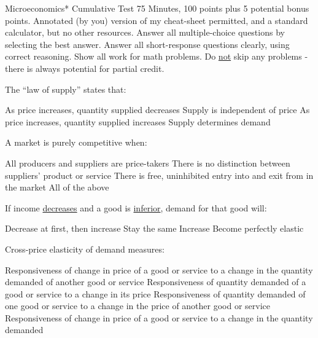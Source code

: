 \documentclass[12pt]{exam}
\begin{document}
\FontEasyRead

\Heading
{Microeconomics*}
{Cumulative Test}
{75 Minutes, 100 points plus 5 potential bonus points.
  Annotated (by you) version of my cheat-sheet permitted, and a standard calculator, but
  no other resources. Answer all multiple-choice questions by selecting the best answer.
  Answer all short-response questions clearly, using correct reasoning.
  Show all work for math problems. Do \underline{not} skip any problems - there
is always potential for partial credit.}


\begin{questions}

  \begin{mcquestion}[2]
    The ``law of supply'' states that:
    \begin{choices}
      \choice As price increases, quantity supplied decreases
      \choice Supply is independent of price
      \CorrectChoice As price increases, quantity supplied increases
      \choice Supply determines demand
    \end{choices}
  \end{mcquestion}

  \begin{mcquestion}[2]
    A market is purely competitive when:
    \begin{choices}
      \choice All producers and suppliers are price-takers
      \choice There is no distinction between suppliers' product or service
      \choice There is free, uninhibited entry into and exit from in the market
      \CorrectChoice All of the above
    \end{choices}
  \end{mcquestion}

  \begin{mcquestion}[2]
    If income \underline{decreases} and a good is \underline{inferior}, demand for that good will:
    \begin{choices}
      \choice Decrease at first, then increase
      \choice Stay the same
      \CorrectChoice Increase
      \choice Become perfectly elastic
    \end{choices}
  \end{mcquestion}

  \begin{mcquestion}[2]
    Cross-price elasticity of demand measures:
    \begin{choices}
      \choice Responsiveness of change in price of a good or service to a change in the quantity demanded of another good or service
      \choice Responsiveness of quantity demanded of a good or service to a change in its price
      \CorrectChoice Responsiveness of quantity demanded of one good or service to a change in the price of another good or service
      \choice Responsiveness of change in price of a good or service to a change in the quantity demanded
    \end{choices}
  \end{mcquestion}


\end{questions}
\end{document}
